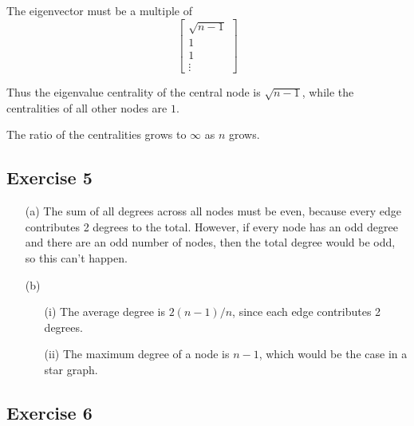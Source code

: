 \documentclass{article}
\begin{document}
The eigenvector must be a multiple of
\[
  \begin{bmatrix}
    \sqrt{n - 1} \\ 1 \\ 1 \\ \vdots
  \end{bmatrix}
\]

Thus the eigenvalue centrality of the central node is \( \sqrt{n - 1} \), while
the centralities of all other nodes are \( 1 \).

The ratio of the centralities grows to \( \infty \) as \( n \) grows.

\newpage

\subsection*{Exercise 5}

\begin{enumerate}
  \item[(a)]
  The sum of all degrees across all nodes must be even, because every edge
  contributes 2 degrees to the total. However, if every node has an odd degree
  and there are an odd number of nodes, then the total degree would be odd, so
  this can't happen.

  \item[(b)]
  \begin{enumerate}
    \item[(i)]
    The average degree is \( 2(n - 1) / n \), since each edge contributes 2
    degrees.

    \item[(ii)]
    The maximum degree of a node is \( n - 1 \), which would be the case in a
    star graph.
  \end{enumerate}
\end{enumerate}

\newpage

\subsection*{Exercise 6}
\end{document}
